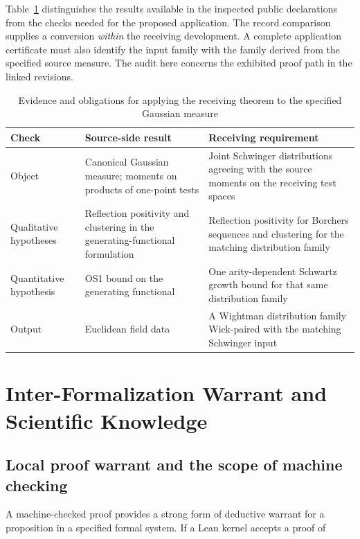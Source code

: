 \documentclass[pdflatex,sn-apa]{sn-jnl}
\begin{document}
Table~\ref{tab:os-interface} distinguishes the results available in the inspected public declarations from the checks needed for the proposed application. The record comparison supplies a conversion \emph{within} the receiving development. A complete application certificate must also identify the input family with the family derived from the specified source measure. The audit here concerns the exhibited proof path in the linked revisions.

\begin{table}[htbp]
\caption{Evidence and obligations for applying the receiving theorem to the specified Gaussian measure}
\label{tab:os-interface}
\centering\small
\renewcommand{\arraystretch}{1.17}
\begin{tabular}{@{}p{.16\linewidth}p{.36\linewidth}p{.40\linewidth}@{}}
\hline
Check & Source-side result & Receiving requirement \\
\hline
Object & Canonical Gaussian measure; moments on products of one-point tests & Joint Schwinger distributions agreeing with the source moments on the receiving test spaces \\
Qualitative hypotheses & Reflection positivity and clustering in the generating-functional formulation & Reflection positivity for Borchers sequences and clustering for the matching distribution family \\
Quantitative hypothesis & OS1 bound on the generating functional & One arity-dependent Schwartz growth bound for that same distribution family \\
Output & Euclidean field data & A Wightman distribution family Wick-paired with the matching Schwinger input \\
\hline
\end{tabular}
\end{table}

\section{Inter-Formalization Warrant and Scientific Knowledge}

\subsection{Local proof warrant and the scope of machine checking}

A machine-checked proof provides a strong form of deductive warrant for a proposition in a specified formal system. If a Lean kernel accepts a proof of
\end{document}

